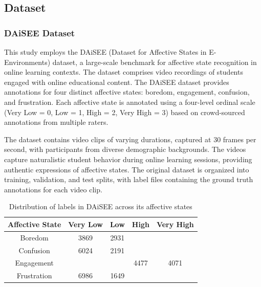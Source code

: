 \documentclass[11pt,a4paper]{article}
\begin{document}
\subsection{Dataset}

\subsubsection{DAiSEE Dataset}

This study employs the DAiSEE (Dataset for Affective States in E-Environments) dataset, a large-scale benchmark for affective state recognition in online learning contexts\cite{gupta2016daisee}. The dataset comprises video recordings of students engaged with online educational content. The DAiSEE dataset provides annotations for four distinct affective states: boredom, engagement, confusion, and frustration. Each affective state is annotated using a four-level ordinal scale (Very Low = 0, Low = 1, High = 2, Very High = 3) based on crowd-sourced annotations from multiple raters.

The dataset contains video clips of varying durations, captured at 30 frames per second, with participants from diverse demographic backgrounds. The videos capture naturalistic student behavior during online learning sessions, providing authentic expressions of affective states. The original dataset is organized into training, validation, and test splits, with label files containing the ground truth annotations for each video clip.


\begin{table}[h]
  \caption{Distribution of labels in DAiSEE across its affective states}
  \label{tab_daisee_labels}
  \centering
  \begin{tabular}{|c|c|c|c|c|}
    \hline
    \textbf{Affective State} & \textbf{Very Low} & \textbf{Low}  & \textbf{High} & \textbf{Very High} \\ \hline
    Boredom         & 3869     & 2931 & \cellcolor{green!20}{1934} & \cellcolor{green!20}{334}       \\ \hline
    Confusion       & 6024     & 2191 & \cellcolor{green!20}{752}  & \cellcolor{green!20}{101}       \\ \hline
    Engagement      & \cellcolor{green!20}{61}       & \cellcolor{green!20}{459}  & 4477 & 4071      \\ \hline
    Frustration     & 6986     & 1649 & \cellcolor{green!20}{346}  & \cellcolor{green!20}{87}        \\ \hline
  \end{tabular}
\end{table}
\end{document}
